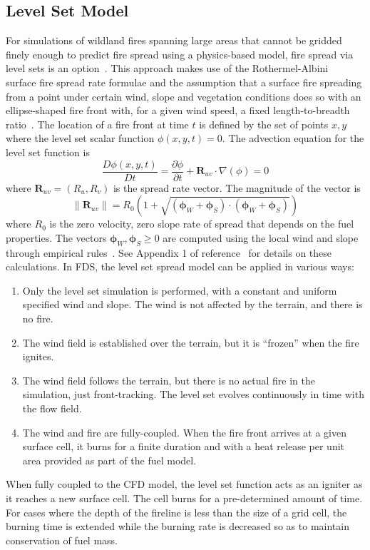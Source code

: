 \documentclass[journal,article,atmosphere,submit,moreauthors,pdftex]{Definitions/mdpi}
\begin{document}
\subsection{Level Set Model}

For simulations of wildland fires spanning large areas that cannot be gridded finely enough to predict fire spread using a physics-based model, fire spread via level sets is an option~\cite{Bova:IJWF2015}. This approach makes use of the Rothermel-Albini~\cite{Rothermel:1972,Albini:1976} surface fire spread rate formulae and the assumption that a surface fire spreading from a point under certain wind, slope and vegetation conditions does so with an ellipse-shaped fire front with, for a given wind speed, a fixed length-to-breadth ratio~\cite{Richards:1990}. The location of a fire front at time $t$ is defined by the set of points $x,y$ where the level set scalar function $\phi(x,y,t)=0$. The advection equation for the level set function is
\begin{equation}
   \frac{D \phi(x,y,t)}{D t} =  \frac{\partial \phi}{\partial t} + \mathbf{R}_{uv} \cdot \nabla (\phi) = 0 \label{eqn:lset}
\end{equation}
where $\mathbf{R}_{uv}=(R_u,R_v)$ is the spread rate vector. The magnitude of the vector is
\begin{equation}
  \|\mathbf{R}_{uv}\|=R_0 \left(1 + \sqrt{(\boldsymbol{\phi}_W+\boldsymbol{\phi}_S) \cdot (\boldsymbol{\phi}_W+\boldsymbol{\phi}_S) } \right)
\end{equation}
where $R_0$ is the zero velocity, zero slope rate of spread that depends on the fuel properties. The vectors $\boldsymbol{\phi}_W,\boldsymbol{\phi}_S \ge 0$ are computed using the local wind and slope through empirical rules~\cite{Wilson:1980}. See Appendix 1 of reference~\cite{Bova:IJWF2015} for details on these calculations. In FDS, the level set spread model can be applied in various ways:
\begin{enumerate}
\item Only the level set simulation is performed, with a constant and uniform specified wind and slope. The wind is not affected by the terrain, and there is no fire.
\item The wind field is established over the terrain, but it is ``frozen'' when the fire ignites.
\item The wind field follows the terrain, but there is no actual fire in the simulation, just front-tracking.  The level set evolves continuously in time with the flow field.
\item The wind and fire are fully-coupled. When the fire front arrives at a given surface cell, it burns for a finite duration and with a heat release per unit area provided as part of the fuel model.
\end{enumerate}
When fully coupled to the CFD model, the level set function acts as an igniter as it reaches a new surface cell. The cell burns for a pre-determined amount of time. For cases where the depth of the fireline is less than the size of a grid cell, the burning time is extended while the burning rate is decreased so as to maintain conservation of fuel mass.
\end{document}
